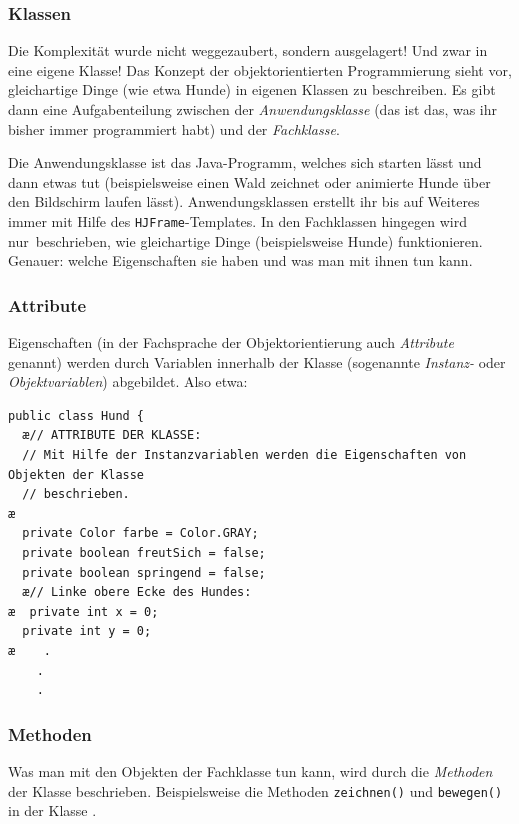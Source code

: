 \subsubsection{Klassen}

Die Komplexität wurde nicht weggezaubert, sondern ausgelagert! Und zwar in eine eigene
Klasse! Das Konzept der objektorientierten Programmierung sieht vor, gleichartige Dinge 
(wie etwa Hunde) in eigenen Klassen zu beschreiben. Es gibt dann eine Aufgabenteilung
zwischen der \emph{Anwendungsklasse} (das ist das, was ihr bisher immer programmiert 
habt) und der \emph{Fachklasse}.

Die Anwendungsklasse ist das Java-Programm, welches sich starten lässt und dann etwas tut 
(beispielsweise einen Wald zeichnet oder animierte Hunde über den Bildschirm laufen lässt).
Anwendungsklassen erstellt ihr bis auf Weiteres immer mit Hilfe des \lstinline|HJFrame|-Templates.
In den Fachklassen hingegen wird \glqq nur\grqq\ beschrieben, wie gleichartige Dinge 
(beispielsweise Hunde) funktionieren. Genauer: welche Eigenschaften sie haben und was man mit
ihnen tun kann.

\subsubsection{Attribute}

Eigenschaften (in der Fachsprache der Objektorientierung auch \emph{Attribute} genannt)
werden durch Variablen innerhalb der Klasse (sogenannte \emph{Instanz-} oder \emph{Objektvariablen}) abgebildet. Also etwa:

\begin{lstlisting}
public class Hund {
  æ// ATTRIBUTE DER KLASSE:
  // Mit Hilfe der Instanzvariablen werden die Eigenschaften von Objekten der Klasse 
  // beschrieben.
æ	
  private Color farbe = Color.GRAY;
  private boolean freutSich = false;
  private boolean springend = false;
  æ// Linke obere Ecke des Hundes:
æ  private int x = 0;
  private int y = 0;
æ    .
    .
    .
\end{lstlisting}

\subsubsection{Methoden}

Was man mit den Objekten der Fachklasse tun kann, wird durch die \emph{Methoden} der Klasse
beschrieben. Beispielsweise die Methoden \lstinline|zeichnen()| und \lstinline|bewegen()| in der
Klasse .

